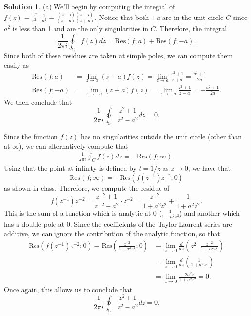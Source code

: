 \documentclass[12pt]{article}
\newcommand{\Res}{\text{Res}}
\theoremstyle{definition}
\newtheorem{sol}{Solution}
\theoremstyle{remark}
\begin{document}
\begin{sol}\leavevmode

    (a) We'll begin by computing the integral of $f(z) = \frac{z^2+1}{z^2-a^2} = \frac{(z-i)(z-i)}{(z-a)(z+a)}$. Notice that both $\pm a$ are in the unit circle $C$ since $a^2$ is less than 1 and are the only singularities in $C$. Therefore, the integral
    \begin{equation}
        \frac{1}{2\pi i} \oint_{C} f(z)dz = \Res(f; a) + \Res(f;-a).
    \end{equation}
Since both of these residues are taken at simple poles, we can compute them easily as
\begin{align}
    \Res(f;a) &=\lim_{z\to a} (z-a)f(z) = \lim_{z\to a} \frac{z^2+1}{z+a} = \frac{a^2 +1}{2a}\\
    \Res(f;-a) &=\lim_{z\to -a} (z+a)f(z) = \lim_{z\to -a} \frac{z^2 + 1}{z-a} = -\frac{a^2+1}{2a}.  
\end{align}
We then conclude that 
\begin{equation}
     \frac{1}{2\pi i} \oint_{C}  \frac{z^2+1}{z^2-a^2} dz = 0.
\end{equation}

Since the function $f(z)$ has no singularities outside the unit circle (other than at $\infty$), we can alternatively compute that 
\begin{align}
        \frac{1}{2\pi i} \oint_{C} f(z)dz = -\Res(f; \infty).
\end{align}
Using that the point at infinity is defined by $t = 1/z$ as $z\to 0$, we have that 
\begin{equation}
    \Res(f;\infty) = - \Res(f(z^{-1})z^{-2};0)
\end{equation}
as shown in class. Therefore, we compute the residue of 
\begin{equation}
    f(z^{-1})z^{-2} = \frac{z^{-2} + 1}{z^{-2} + a^2} \cdot z^{-2} = \frac{z^{-2}}{1+a^2z^2} + \frac{1}{1+a^2z^2}.   
\end{equation}
This is the sum of a function which is analytic at 0 ($\frac{1}{1+a^2z^2}$) and another which has a double pole at 0. Since the coefficients of the Taylor-Laurent series are additive, we can ignore the contribution of the analytic function, so that 
\begin{align}
    \Res(f(z^{-1})z^{-2};0) = \Res \left(\frac{z^{-2}}{1+a^2z^2};0\right) &= \lim_{z\to 0} \frac{d}{dz} \left( z^2 \cdot \frac{z^{-2}}{1+a^2z^2} \right)\\
                                                                          &= \lim_{z\to 0} \frac{d}{dz} \left( \frac{1}{1+a^2z^2} \right)\\
                                                                          &= \lim_{z\to 0}\frac{-2a^2z}{1 + a^2z^2} = 0.
\end{align}
Once again, this allows us to conclude that
\begin{equation}
     \frac{1}{2\pi i} \oint_{C}  \frac{z^2+1}{z^2-a^2} dz = 0.
\end{equation}


\end{sol}
\end{document}
